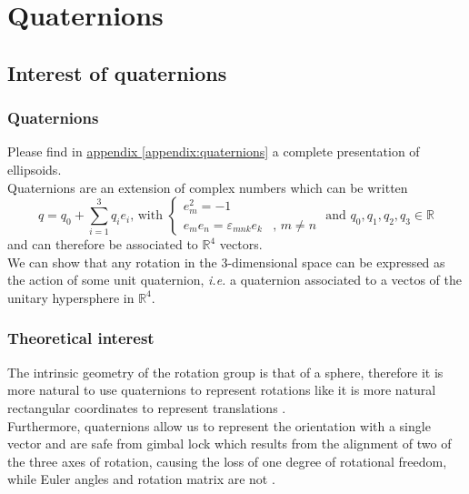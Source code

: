 \documentclass[class=report, float=false, crop=false]{standalone}
\begin{document}
\chapter{Quaternions}
\label{chap:quaternions}

\section{Interest of quaternions}

\subsection{Quaternions}

Please find in \hyperref[appendix:quaternions]{appendix \ref{appendix:quaternions}} a complete presentation of ellipsoids.\\

Quaternions are an extension of complex numbers which can be written
\begin{equation}
q = q_0 + \sum_{i=1}^{3}q_i e_i\text{, with } \begin{cases} e_m^2 = -1& \\ e_me_n = \varepsilon_{mnk} e_k&\text{, } m \neq n \end{cases} \text{ and } q_0,q_1,q_2,q_3 \in \mathbb{R}
\end{equation}
and can therefore be associated to $\mathbb{R}^4$ vectors.\\

We can show that any rotation in the 3-dimensional space can be expressed as the action of some unit quaternion, \textit{i.e.} a quaternion associated to a vectos of the unitary hypersphere in $\mathbb{R}^4$.

\subsection{Theoretical interest}

The intrinsic geometry of the rotation group is that of a sphere, therefore it is more natural to use quaternions to represent rotations like it is more natural rectangular coordinates to represent translations \cite{shoemake1985animating}.\\

Furthermore, quaternions allow us to represent the orientation with a single vector and are safe from gimbal lock which results from the alignment of two of the three axes of rotation, causing the loss of one degree of rotational freedom, while Euler angles and rotation matrix are not \cite{munjiza2009application}.
\end{document}
